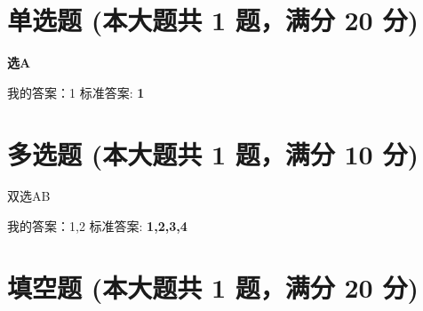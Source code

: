 \documentclass[12pt, a4paper, addpoints]{exam}
\begin{document}
\pagestyle{headandfoot}

\begin{center}
\end{center}
\vspace{5mm}

\normalsize
\vspace{5mm}

\section{\normalsize{单选题 (本大题共 1 题，满分 20 分)}}
\hspace{1.5cm}

\begin{questions}
\question[20] \textbf{选A}

\begin{oneparchoices}
\end{oneparchoices}
我的答案：1
标准答案: \textbf{1}

\end{questions}

\hspace{5cm}

\section{\normalsize{多选题 (本大题共 1 题，满分 10 分)}}
\hspace{1.5cm}
\begin{multicols}{2}
\begin{questions}
\question[10] 双选AB

\begin{checkboxes}
\end{checkboxes}

我的答案：1,2
标准答案: \textbf{1,2,3,4}

\end{questions}
\end{multicols}

\hspace{5cm}

\section{\normalsize{填空题 (本大题共 1 题，满分 20 分)}}
\hspace{1.5cm}
\end{document}
